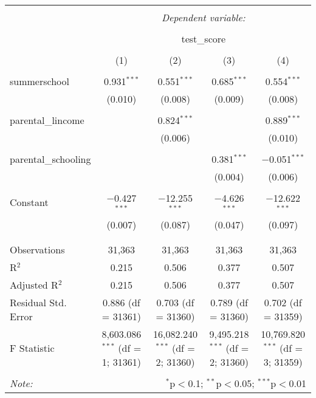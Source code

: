 
\begin{table}[!htbp] \centering 
  \caption{} 
  \label{} 
\begin{tabular}{@{\extracolsep{5pt}}lcccc} 
\\[-1.8ex]\hline 
\hline \\[-1.8ex] 
 & \multicolumn{4}{c}{\textit{Dependent variable:}} \\ 
\cline{2-5} 
\\[-1.8ex] & \multicolumn{4}{c}{test\_score} \\ 
\\[-1.8ex] & (1) & (2) & (3) & (4)\\ 
\hline \\[-1.8ex] 
 summerschool & 0.931$^{***}$ & 0.551$^{***}$ & 0.685$^{***}$ & 0.554$^{***}$ \\ 
  & (0.010) & (0.008) & (0.009) & (0.008) \\ 
  & & & & \\ 
 parental\_lincome &  & 0.824$^{***}$ &  & 0.889$^{***}$ \\ 
  &  & (0.006) &  & (0.010) \\ 
  & & & & \\ 
 parental\_schooling &  &  & 0.381$^{***}$ & $-$0.051$^{***}$ \\ 
  &  &  & (0.004) & (0.006) \\ 
  & & & & \\ 
 Constant & $-$0.427$^{***}$ & $-$12.255$^{***}$ & $-$4.626$^{***}$ & $-$12.622$^{***}$ \\ 
  & (0.007) & (0.087) & (0.047) & (0.097) \\ 
  & & & & \\ 
\hline \\[-1.8ex] 
Observations & 31,363 & 31,363 & 31,363 & 31,363 \\ 
R$^{2}$ & 0.215 & 0.506 & 0.377 & 0.507 \\ 
Adjusted R$^{2}$ & 0.215 & 0.506 & 0.377 & 0.507 \\ 
Residual Std. Error & 0.886 (df = 31361) & 0.703 (df = 31360) & 0.789 (df = 31360) & 0.702 (df = 31359) \\ 
F Statistic & 8,603.086$^{***}$ (df = 1; 31361) & 16,082.240$^{***}$ (df = 2; 31360) & 9,495.218$^{***}$ (df = 2; 31360) & 10,769.820$^{***}$ (df = 3; 31359) \\ 
\hline 
\hline \\[-1.8ex] 
\textit{Note:}  & \multicolumn{4}{r}{$^{*}$p$<$0.1; $^{**}$p$<$0.05; $^{***}$p$<$0.01} \\ 
\end{tabular} 
\end{table} 
